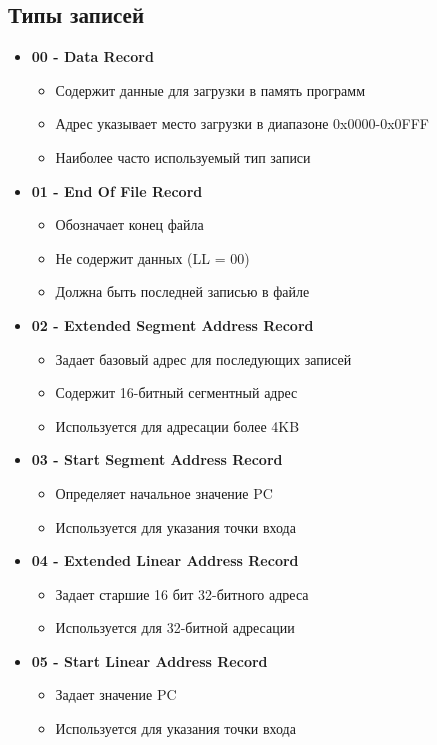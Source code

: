 \documentclass[a4paper, 12pt]{article}
\begin{document}
\subsection{Типы записей}
\begin{itemize}
    \item \textbf{00 - Data Record}
    \begin{itemize}
        \item Содержит данные для загрузки в память программ
        \item Адрес указывает место загрузки в диапазоне 0x0000-0x0FFF
        \item Наиболее часто используемый тип записи
    \end{itemize}
    \item \textbf{01 - End Of File Record}
    \begin{itemize}
        \item Обозначает конец файла
        \item Не содержит данных (LL = 00)
        \item Должна быть последней записью в файле
    \end{itemize}
    \item \textbf{02 - Extended Segment Address Record}
    \begin{itemize}
        \item Задает базовый адрес для последующих записей
        \item Содержит 16-битный сегментный адрес
        \item Используется для адресации более 4KB
    \end{itemize}
    \item \textbf{03 - Start Segment Address Record}
    \begin{itemize}
        \item Определяет начальное значение PC
        \item Используется для указания точки входа
    \end{itemize}
    \item \textbf{04 - Extended Linear Address Record}
    \begin{itemize}
        \item Задает старшие 16 бит 32-битного адреса
        \item Используется для 32-битной адресации
    \end{itemize}
    \item \textbf{05 - Start Linear Address Record}
    \begin{itemize}
        \item Задает значение PC
        \item Используется для указания точки входа
    \end{itemize}
\end{itemize}
\end{document}
